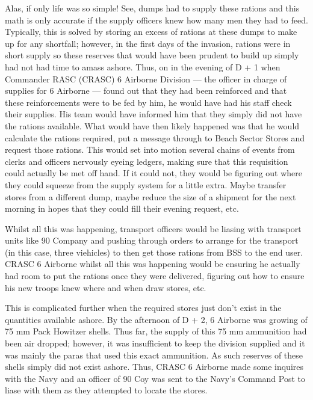 \documentclass[noraggedright]{turabian-researchpaper}
\begin{document}
Alas, if only life was so simple!  See, dumps had to supply these rations
and this math is only accurate if the supply officers knew how many men they
had to feed.  Typically, this is solved by storing an excess of rations at 
these dumps to make up for any shortfall; however, in the first days of the
invasion, rations were in short supply so these reserves that would have 
been prudent to build up simply had not had time to amass ashore.  Thus, on
in the evening of D + 1 when Commander RASC (CRASC) 6 Airborne Division --- 
the officer in charge of supplies for 6 Airborne
--- found out that they had been reinforced and that these reinforcements 
were to be fed by him, he would have had his staff check their supplies.  
His team would have informed him that they simply did not have the rations 
available.\autocite[6]{90wdjun}
  What would have then likely happened was that he would calculate 
the rations required, put a message through to Beach Sector Stores and request 
those rations.  This would set into motion several chains of events from 
clerks and officers nervously eyeing ledgers, making sure that this requisition
could actually be met off hand.  If it could not, they would be figuring out 
where they could squeeze from the supply system for a little extra.  Maybe
transfer stores from a different dump, maybe reduce the size of a shipment for
the next morning in hopes that they could fill their evening request, etc.  

Whilst all this was happening, transport officers would be liasing with 
transport units like 90 Company and pushing through orders to arrange for 
the transport (in this case, three viehicles) to then get those rations from
BSS to the end user.  CRASC 6 Airborne whilst all this was happening would be
ensuring he actually had room to put the rations once they were delivered, 
figuring out how to ensure his new troops knew where and when draw stores,
etc.  

This is complicated further when the required stores just don't exist in the
quantities available ashore.  By the afternoon of D + 2, 6 Airborne was 
growing of 75 mm Pack Howitzer shells.  Thus far, the supply of this 75 mm 
ammunition had been air dropped; however, it was insufficient to keep the
division supplied and it was mainly the paras that used this exact ammunition.  
As such reserves of these shells simply did not exist ashore.  Thus, CRASC 6
Airborne made some inquires with the Navy and an officer of 90 Coy was sent to 
the Navy's Command Post to liase with them as they attempted to locate the 
stores.\autocite[7]{90wdjun}
\end{document}

